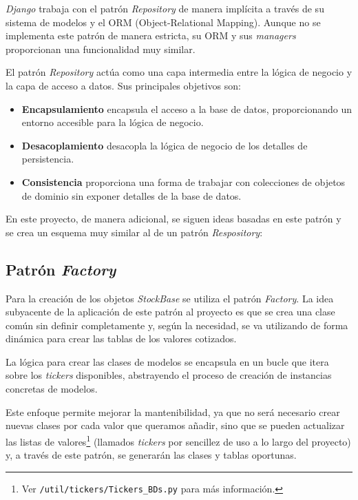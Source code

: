 \emph{Django} trabaja con el patrón \emph{Repository} de manera implícita a través de su sistema de modelos y el ORM (Object-Relational Mapping)\citep{wiki:ORM}. Aunque no se implementa este patrón de manera estricta, su ORM y sus \emph{managers} proporcionan una funcionalidad muy similar.

El patrón \emph{Repository} actúa como una capa intermedia entre la lógica de negocio y la capa de acceso a datos. Sus principales objetivos son:

\begin{itemize}
\tightlist
\item 
\textbf{Encapsulamiento} encapsula el acceso a la base de datos, proporcionando un entorno accesible para la lógica de negocio.
\item
\textbf{Desacoplamiento} desacopla la lógica de negocio de los detalles de persistencia.
\item 
\textbf{Consistencia} proporciona una forma de trabajar con colecciones de objetos de dominio sin exponer detalles de la base de datos.
\end{itemize}

En este proyecto, de manera adicional, se siguen ideas basadas en este patrón y se crea un esquema muy similar al de un patrón \emph{Respository}:


\subsection{Patrón \emph{Factory}}

Para la creación de los objetos \emph{StockBase} se utiliza el patrón \emph{Factory}. La idea subyacente de la aplicación de este patrón al proyecto es que se crea una clase común sin definir completamente y, según la necesidad, se va utilizando de forma dinámica para crear las tablas de los valores cotizados. 

La lógica para crear las clases de modelos se encapsula en un bucle que itera sobre los \emph{tickers} disponibles, abstrayendo el proceso de creación de instancias concretas de modelos.

Este enfoque permite mejorar la mantenibilidad, ya que no será necesario crear nuevas clases por cada valor que queramos añadir, sino que se pueden actualizar las  listas de valores\footnote{Ver \texttt{/util/tickers/Tickers\_BDs.py} para más información.} (llamados \emph{tickers} por sencillez de uso a lo largo del proyecto) y, a través de este patrón, se generarán las clases y tablas oportunas. 

